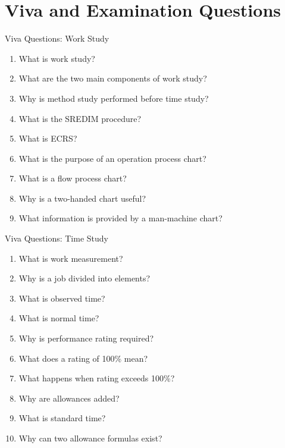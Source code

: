 \documentclass[aspectratio=169,10pt]{beamer}
\begin{document}

\section{Viva and Examination Questions}

\begin{frame}[shrink=18]{Viva Questions: Work Study}
\small

\begin{enumerate}
    \item What is work study?
    \item What are the two main components of work study?
    \item Why is method study performed before time study?
    \item What is the SREDIM procedure?
    \item What is ECRS?
    \item What is the purpose of an operation process chart?
    \item What is a flow process chart?
    \item Why is a two-handed chart useful?
    \item What information is provided by a man-machine chart?
\end{enumerate}

\end{frame}


\begin{frame}[shrink=18]{Viva Questions: Time Study}
\small

\begin{enumerate}
    \item What is work measurement?
    \item Why is a job divided into elements?
    \item What is observed time?
    \item What is normal time?
    \item Why is performance rating required?
    \item What does a rating of 100\% mean?
    \item What happens when rating exceeds 100\%?
    \item Why are allowances added?
    \item What is standard time?
    \item Why can two allowance formulas exist?
\end{enumerate}

\end{frame}
\end{document}
